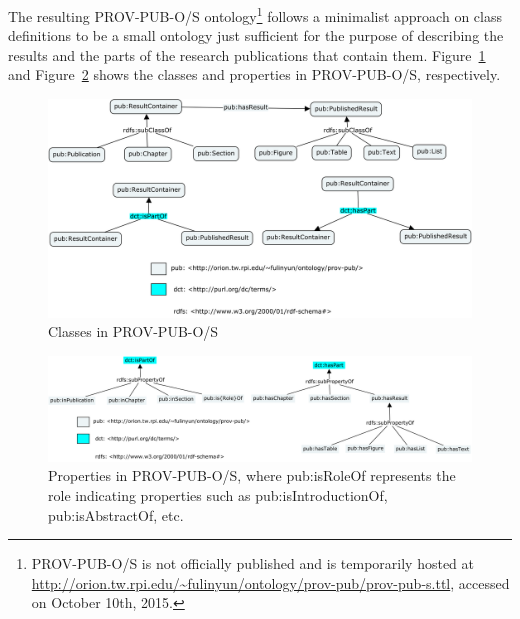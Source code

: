 The resulting PROV-PUB-O/S ontology\footnote{PROV-PUB-O/S is not officially published and is temporarily hosted at \url{http://orion.tw.rpi.edu/~fulinyun/ontology/prov-pub/prov-pub-s.ttl}, accessed on October 10th, 2015.} follows a minimalist approach on class definitions to be a small ontology just sufficient for the purpose of describing the results and the parts of the research publications that contain them. Figure~\ref{fig:prov-pub-s-classes} and Figure~\ref{fig:prov-pub-s-properties} shows the classes and properties in PROV-PUB-O/S, respectively.

\begin{figure}
	\centering
	\includegraphics[width=\textwidth]{model/ontology/prov-pub/prov-pub-s-classes.png}
	\caption{Classes in PROV-PUB-O/S}
	\label{fig:prov-pub-s-classes}
\end{figure}

\begin{figure}
	\centering
	\includegraphics[width=\textwidth]{model/ontology/prov-pub/prov-pub-s-properties.png}
	\caption[Properties in PROV-PUB-O/S]{Properties in PROV-PUB-O/S, where pub:is{Role}Of represents the role indicating properties such as pub:isIntroductionOf, pub:isAbstractOf, etc.}
	\label{fig:prov-pub-s-properties}
\end{figure}


